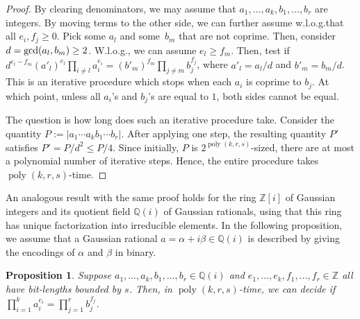 \documentclass[10pt,a4paper]{article}
\DeclareMathOperator{\poly}{poly}
\newtheorem{proposition}[theorem]{Proposition}
\theoremstyle{definition}
\numberwithin{equation}{section}
\newcommand{\QQ}{\mathbb{Q}}
\newcommand{\ZZ}{\mathbb{Z}}
\begin{document}
\begin{proof}
By clearing denominators, we may assume that $a_1,\dots,a_k,b_1,\dots,b_r$ are integers.
By moving terms to the other side, we can further assume w.l.o.g.that all $e_i, f_j \geq 0$.
Pick some $a_l$ and some~$b_m$ that are not coprime. Then, consider $d = {\rm gcd}(a_l, b_m) \geq 2$. W.l.o.g., we can assume $e_l \geq f_m$.
Then, test if $ d^{e_l - f_m} (a'_l)^{e_l}\prod_{i \neq l} a_i^{e_i}  =  (b'_m)^{f_m} \prod_{j \neq m} b_j^{f_j}$, where $a'_l = a_l/d$ and $b'_m = b_m/d$.
This is an iterative procedure which stops when each $a_i$ is coprime to $b_j$. At which point, unless all $a_i$'s and $b_j$'s are equal to $1$, both sides cannot be equal.

The question is how long does such an iterative procedure take.
Consider the quantity $P:= |a_1\cdots a_k b_1 \cdots b_r|$.
After applying one step, the resulting quantity $P'$ satisfies
$P' = P/d^2 \le P/4$. Since initially, $P$ is $2^{\poly(k,r,s)}$-sized,
there are at most a polynomial number of iterative steps.
Hence, the entire procedure takes $\poly(k,r,s)$-time.
\end{proof}

An analogous result with the same proof holds for the ring $\ZZ[i]$ of Gaussian integers and its quotient field $\QQ(i)$ of Gaussian rationals,
using that this ring has unique factorization into irreducible elements.
In the following proposition, we assume that a Gaussian rational $a = \alpha + i \beta \in \QQ(i)$ is described by giving the encodings of $\alpha$ and $\beta$ in binary.

\begin{proposition}\label{prop:monomial}
Suppose $a_1,\dots,a_k,b_1,\dots,b_r\in \QQ(i)$ and $e_1,\dots,e_k, f_1,\dots,f_r \in \ZZ$ all have bit-lengths bounded by $s$.
Then, in $\poly(k,r,s)$-time, we can decide if $\prod_{i=1}^k a_i^{e_i} = \prod_{j=1}^r b_j^{f_j}$.
\end{proposition}

%
%
%
%


%
%
%

%
%
%
\end{document}
